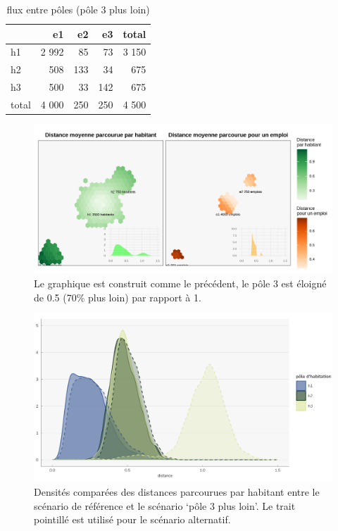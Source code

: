 \documentclass[
  10pt,
  a4paper,
  numbers=noendperiod,
  DIV=12]{scrartcl}
\begin{document}
\hypertarget{tbl-fluxpoles2}{}
\begin{longtable}{lrrrr}
\caption{\label{tbl-fluxpoles2}flux entre pôles (pôle 3 plus loin) }\tabularnewline

\toprule
 & e1 & e2 & e3 & total \\ 
\midrule
h1 & 2 992 & 85 & 73 & 3 150 \\ 
h2 & 508 & 133 & 34 & 675 \\ 
h3 & 500 & 33 & 142 & 675 \\ 
total & 4 000 & 250 & 250 & 4 500 \\ 
\bottomrule
\end{longtable}

\begin{figure}[htb]

{\centering \includegraphics[width=1\textwidth,height=\textheight]{output/gdistances2.png}

}

\caption[Distances moyenne par habitant et pour un emploi (3
éloigné)]{\label{fig-distances2}Le graphique est construit comme le
précédent, le pôle 3 est éloigné de 0.5 (70\% plus loin) par rapport à
1.}

\end{figure}

\begin{figure}[htb]

{\centering \includegraphics[width=1\textwidth,height=\textheight]{output/gdenshabg.png}

}

\caption[Densités comparées]{\label{fig-denscomp}Densités comparées des
distances parcourues par habitant entre le scénario de référence et le
scénario `pôle 3 plus loin'. Le trait pointillé est utilisé pour le
scénario alternatif.}

\end{figure}
\end{document}
